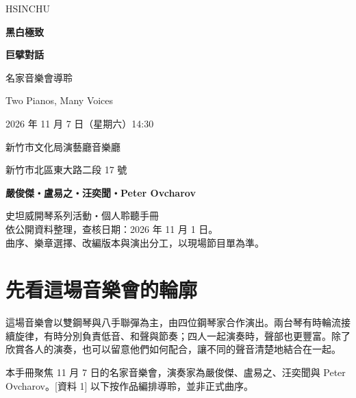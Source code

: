 \documentclass[UTF8,12pt,a4paper,fontset=none]{ctexart}
\newcommand{\src}[1]{{\small\color{accent}[資料 #1]}}
\begin{document}
\begin{titlepage}
\color{ink}
\vspace*{0.4cm}
{\large{}\quad HSINCHU}\par
\vspace{0.7cm}
{\Huge\bfseries 黑白極致}\par\vspace{0.25cm}
{\Huge\bfseries 巨擘對話}\par
\vspace{0.7cm}
{\LARGE 名家音樂會導聆}\par
\vspace{0.2cm}
{\large Two Pianos, Many Voices}\par
\vspace{0.65cm}
\vspace{0.8cm}
{\large 2026 年 11 月 7 日（星期六）14:30}\par
新竹市文化局演藝廳音樂廳\par
新竹市北區東大路二段 17 號\par
\vspace{0.6cm}
\textbf{嚴俊傑・盧易之・汪奕聞・Peter Ovcharov}\par
\vfill
{\small 史坦威開琴系列活動・個人聆聽手冊\\
依公開資料整理，查核日期：2026 年 11 月 1 日。\\
曲序、樂章選擇、改編版本與演出分工，以現場節目單為準。}
\end{titlepage}
\tableofcontents
\clearpage
\section{先看這場音樂會的輪廓}
這場音樂會以雙鋼琴與八手聯彈為主，由四位鋼琴家合作演出。兩台琴有時輪流接續旋律，有時分別負責低音、和聲與節奏；四人一起演奏時，聲部也更豐富。除了欣賞各人的演奏，也可以留意他們如何配合，讓不同的聲音清楚地結合在一起。

本手冊聚焦 11 月 7 日的名家音樂會，演奏家為嚴俊傑、盧易之、汪奕聞與 Peter Ovcharov。\src{1} 以下按作品編排導聆，並非正式曲序。
\end{document}
